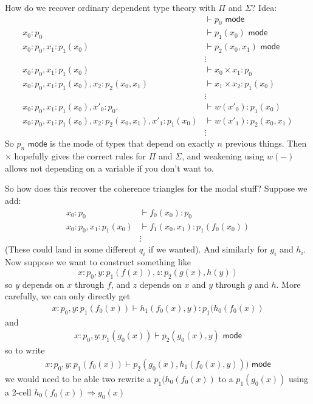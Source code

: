\documentclass[10pt]{article}
\newcommand{\yields}{\vdash}
\newcommand{\mode}{\,\,\mathsf{mode}}
\begin{document}
How do we recover ordinary dependent type theory with $\Pi$ and $\Sigma$? Idea:
\begin{align*}
&\yields p_0 \mode \\
x_0 : p_0 &\yields p_1(x_0) \mode \\
x_0 : p_0, x_1 : p_1(x_0) &\yields p_2(x_0, x_1) \mode \\
&\vdots \\
x_0 : p_0, x_1 : p_1(x_0) &\yields x_0 \times x_1 : p_0 \\
x_0 : p_0, x_1 : p_1(x_0), x_2 : p_2(x_0, x_1) &\yields x_1 \times x_2 : p_1(x_0) \\
&\vdots \\
x_0 : p_0, x_1 : p_1(x_0), x'_0 : p_0,  &\yields w(x'_0) : p_1(x_0) \\
x_0 : p_0, x_1 : p_1(x_0), x_2 : p_2(x_0, x_1), x'_1 : p_1(x_0) &\yields w(x'_1) : p_2(x_0, x_1) \\
&\vdots
\end{align*}
So $p_n \mode$ is the mode of types that depend on exactly $n$ previous things. Then $\times$ hopefully gives the correct rules for $\Pi$ and $\Sigma$, and weakening using $w(-)$ allows not depending on a variable if you don't want to.

So how does this recover the coherence triangles for the modal stuff? Suppose we add:
\begin{align*}
x_0 : p_0 &\yields f_0(x_0) : p_0 \\ 
x_0 : p_0, x_1 : p_1(x_0) &\yields f_1(x_0, x_1) : p_1(f_0(x_0)) \\
&\vdots
\end{align*}
(These could land in some different $q_i$ if we wanted). And similarly for $g_i$ and $h_i$. Now suppose we want to construct something like \[x:p_0, y : p_1(f(x)), z : p_2(g(x), h(y))\] so $y$ depends on $x$ through $f$, and $z$ depends on $x$ and $y$ through $g$ and $h$. More carefully, we can only directly get
\begin{align*}
x : p_0, y : p_1(f_0(x)) \yields h_1(f_0(x), y) : p_1(h_0(f_0(x))
\end{align*}
and 
\begin{align*}
x : p_0, y : p_1(g_0(x)) \yields p_2(g_0(x), y) \mode
\end{align*}
so to write 
\begin{align*}
x : p_0, y : p_1(f_0(x)) \yields p_2(g_0(x), h_1(f_0(x), y))) \mode
\end{align*}
we would need to be able two rewrite a $p_1(h_0(f_0(x))$ to a $p_1(g_0(x))$ using a 2-cell $h_0(f_0(x)) \Rightarrow g_0(x)$
\end{document}
